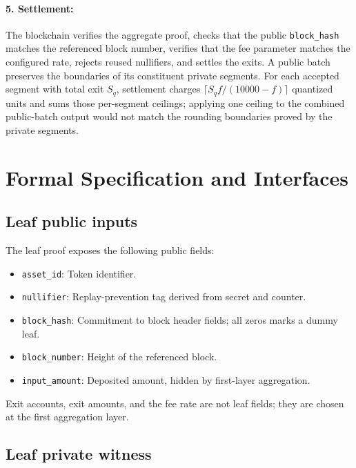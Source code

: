 \documentclass{iacrcc}
\begin{document}
\paragraph{5. Settlement:}
The blockchain verifies the aggregate proof, checks that the public \texttt{block\_hash} matches the referenced block number, verifies that the fee parameter matches the configured rate, rejects reused nullifiers, and settles the exits. A public batch preserves the boundaries of its constituent private segments. For each accepted segment with total exit \(S_q\), settlement charges \(\lceil S_q f/(10000-f)\rceil\) quantized units and sums those per-segment ceilings; applying one ceiling to the combined public-batch output would not match the rounding boundaries proved by the private segments.

\section{Formal Specification and Interfaces}
\label{sec:formal}

\subsection{Leaf public inputs}

The leaf proof exposes the following public fields:
\begin{itemize}[leftmargin=1.5em]
    \item \texttt{asset\_id}: Token identifier.
    \item \texttt{nullifier}: Replay-prevention tag derived from secret and counter.
    \item \texttt{block\_hash}: Commitment to block header fields; all zeros marks a dummy leaf.
    \item \texttt{block\_number}: Height of the referenced block.
    \item \texttt{input\_amount}: Deposited amount, hidden by first-layer aggregation.
\end{itemize}
Exit accounts, exit amounts, and the fee rate are not leaf fields; they are chosen at the first aggregation layer.

\subsection{Leaf private witness}
\end{document}
